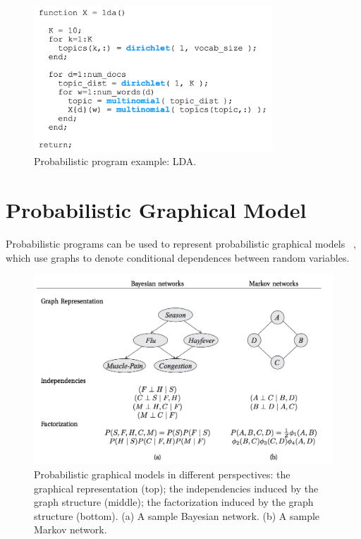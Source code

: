 \begin{figure}
    \centering
    \includegraphics[width=0.8\textwidth]{figures/lda_eg.png}
    \caption{Probabilistic program example: LDA.}
    \label{fig:lda}
\end{figure}


\section{Probabilistic Graphical Model}
\label{sec:pgm}
Probabilistic programs can be used to represent probabilistic graphical models ~\cite{pgm}, which use graphs to denote conditional dependences between random variables.

\begin{figure}
    \centering
    \includegraphics[width=\textwidth]{figures/pgm.png}
    \caption{Probabilistic graphical models in different perspectives: the graphical representation (top); the independencies induced by the graph structure (middle); the factorization induced by the graph structure (bottom). (a) A sample Bayesian network. (b) A sample Markov network.}
    \label{fig:pgm}
\end{figure}

